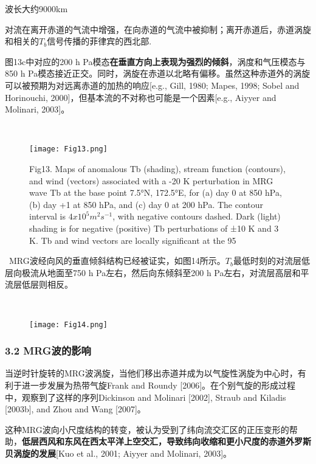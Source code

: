 \documentclass{article}
\begin{document}
\begin{CJK*}{UTF8}{gbsn}
波长大约9000km

对流在离开赤道的气流中增强，在向赤道的气流中被抑制；离开赤道后，赤道涡旋和相关的$T_b$信号传播的菲律宾的西北部.

图13c中对应的200 h Pa模态\textbf{在垂直方向上表现为强烈的倾斜}，涡度和气压模态与850 h Pa模态接近正交。同时，涡旋在赤道以北略有偏移。虽然这种赤道外的涡旋可以被预期为对远离赤道的加热的响应[e.g., Gill, 1980; Mapes, 1998; Sobel and Horinouchi, 2000]，但基本流的不对称也可能是一个因素[e.g., Aiyyer and Molinari, 2003]。

\ 


\begin{figure}
    \centering
    \texttt{[image: Fig13.png]}
    \caption{
    Fig13.
    Maps of anomalous Tb (shading), stream function (contours), and wind (vectors) associated with a -20 K perturbation in MRG wave Tb at the base point 7.5°N, 172.5°E, for (a) day 0 at 850 hPa, (b) day +1 at 850 hPa, and (c) day 0 at 200 hPa. The contour interval is $4x10^5 m^2 s^{-1}$, with negative contours dashed. Dark (light) shading is for negative (positive) Tb perturbations of ±10 K and 3 K. Tb and wind vectors are locally significant at the 95%
   }
\end{figure}



\ 
MRG波经向风的垂直倾斜结构已经被证实，如图14所示。$T_b$最低时刻的对流层低层向极流从地面至750 h Pa左右，然后向东倾斜至200 h Pa左右，对流层高层和平流层低层则相反。





\ 
\begin{figure}
    \centering
    \texttt{[image: Fig14.png]}

\end{figure}

\subsubsection*{3.2 MRG波的影响}

当逆时针旋转的MRG波涡旋，当他们移出赤道并成为以气旋性涡旋为中心时，有利于进一步发展为热带气旋Frank and Roundy [2006]。在个别气旋的形成过程中，观察到了这样的序列Dickinson and Molinari [2002], Straub and Kiladis [2003b], and Zhou and Wang [2007]。

这种MRG波向小尺度结构的转变，被认为受到了纬向流交汇区的正压变形的帮助，\textbf{低层西风和东风在西太平洋上空交汇，导致纬向收缩和更小尺度的赤道外罗斯贝涡旋的发展}[Kuo et al., 2001; Aiyyer and Molinari, 2003]。


\end{CJK*}
\end{document}
